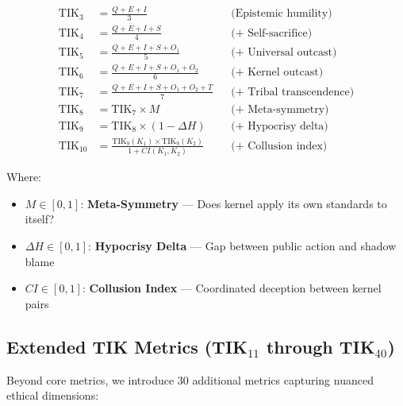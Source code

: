 \documentclass[11pt,a4paper]{article}
\theoremstyle{definition}
\theoremstyle{remark}
\newcommand{\TIKthree}{\text{TIK}_3}
\newcommand{\TIKfour}{\text{TIK}_4}
\newcommand{\TIKfive}{\text{TIK}_5}
\newcommand{\TIKsix}{\text{TIK}_6}
\newcommand{\TIKseven}{\text{TIK}_7}
\newcommand{\TIKeight}{\text{TIK}_8}
\newcommand{\TIKnine}{\text{TIK}_9}
\newcommand{\TIKten}{\text{TIK}_{10}}
\begin{document}
\begin{align}
    \TIKthree &= \frac{Q + E + I}{3} && \text{(Epistemic humility)} \label{eq:tik3} \\[0.5em]
    \TIKfour &= \frac{Q + E + I + S}{4} && \text{(+ Self-sacrifice)} \label{eq:tik4} \\[0.5em]
    \TIKfive &= \frac{Q + E + I + S + O_1}{5} && \text{(+ Universal outcast)} \label{eq:tik5} \\[0.5em]
    \TIKsix &= \frac{Q + E + I + S + O_1 + O_2}{6} && \text{(+ Kernel outcast)} \label{eq:tik6} \\[0.5em]
    \TIKseven &= \frac{Q + E + I + S + O_1 + O_2 + T}{7} && \text{(+ Tribal transcendence)} \label{eq:tik7} \\[0.5em]
    \TIKeight &= \TIKseven \times M && \text{(+ Meta-symmetry)} \label{eq:tik8} \\[0.5em]
    \TIKnine &= \TIKeight \times (1 - \Delta H) && \text{(+ Hypocrisy delta)} \label{eq:tik9} \\[0.5em]
    \TIKten &= \frac{\TIKnine(K_1) \times \TIKnine(K_2)}{1 + CI(K_1, K_2)} && \text{(+ Collusion index)} \label{eq:tik10}
\end{align}

Where:
\begin{itemize}
    \item $M \in [0,1]$: \textbf{Meta-Symmetry} --- Does kernel apply its own standards to itself?
    \item $\Delta H \in [0,1]$: \textbf{Hypocrisy Delta} --- Gap between public action and shadow blame
    \item $CI \in [0,1]$: \textbf{Collusion Index} --- Coordinated deception between kernel pairs
\end{itemize}

\subsection{Extended TIK Metrics (TIK$_{11}$ through TIK$_{40}$)}

Beyond core metrics, we introduce 30 additional metrics capturing nuanced ethical dimensions:
\end{document}

